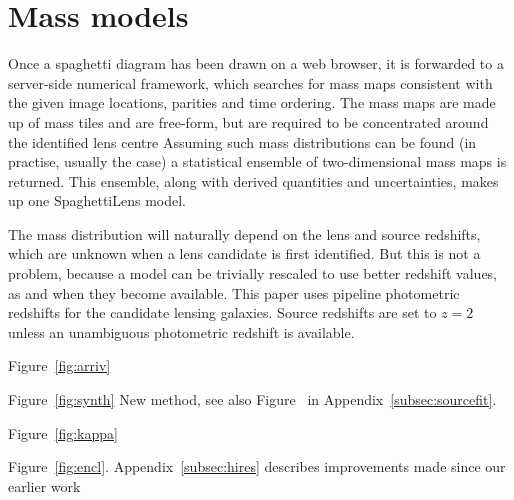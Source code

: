 \section{Mass models}\label{sec:massmodels}

Once a spaghetti diagram has been drawn on a web browser, it is
forwarded to a server-side numerical framework, which searches for
mass maps consistent with the given image locations, parities and time
ordering.  The mass maps are made up of mass tiles and are free-form,
but are required to be concentrated around the identified lens centre
\citep[see][for the precise formulation of the search
  problem.]{2014MNRAS.445.2181C} Assuming such mass distributions can
be found (in practise, usually the case) a statistical ensemble of
two-dimensional mass maps is returned.  This ensemble, along with
derived quantities and uncertainties, makes up one SpaghettiLens
model.

The mass distribution will naturally depend on the lens and source
redshifts, which are unknown when a lens candidate is first
identified.  But this is not a problem, because a model can be
trivially rescaled to use better redshift values, as and when they
become available.  This paper uses pipeline photometric redshifts for
the candidate lensing galaxies.  Source redshifts are set to $z=2$
unless an unambiguous photometric redshift is available.

Figure~\ref{fig:arriv}

Figure~\ref{fig:synth}
New method, see also Figure~ in
Appendix~\ref{subsec:sourcefit}.

Figure~\ref{fig:kappa}

Figure~\ref{fig:encl}. Appendix~\ref{subsec:hires} describes
improvements made since our earlier work \citep{2015MNRAS.447.2170K}



\endinput



  The ensemble average
can, however, be a useful representative of the whole ensemble.  The
user interface of SpaghettiLens returns graphical representations of
the ensemble-average mass map and some derived quantities to the
modeller for review.  The modeller can post these results on a forum,
or discard them and try again.  Other volunteers can start the
modelling process afresh, or they can take an existing model from the
forum and modify its input spaghetti diagram or its accompanying
options, and thus obtain a revised model.



